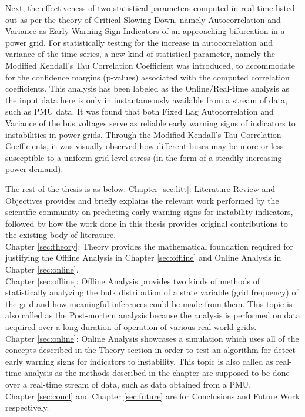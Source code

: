 Next, the effectiveness of two statistical parameters computed in real-time listed out as per the theory of Critical Slowing Down, namely Autocorrelation and Variance as Early Warning Sign Indicators of an approaching bifurcation in a power grid. For statistically testing for the increase in autocorrelation and variance of the time-series, a new kind of statistical parameter, namely the Modified Kendall's Tau Correlation Coefficient was introduced, to accommodate for the confidence margins (p-values) associated with the computed correlation coefficients. This analysis has been labeled as the Online/Real-time analysis as the input data here is only in instantaneously available from a stream of data, such as PMU data. It was found that both Fixed Lag Autocorrelation and Variance of the bus voltages serve as reliable early warning signs of indicators to instabilities in power grids. Through the Modified Kendall's Tau Correlation Coefficients, it was visually observed how different buses may be more or less susceptible to a uniform grid-level stress (in the form of a steadily increasing power demand).

The rest of the thesis is as below:
Chapter \ref{sec:litt}: Literature Review and Objectives provides and briefly explains the relevant work performed by the scientific community on predicting early warning signs for instability indicators, followed by how the work done in this thesis provides original contributions to the existing body of literature.  \\
Chapter \ref{sec:theory}: Theory provides the mathematical foundation required for justifying the Offline Analysis in Chapter \ref{sec:offline} and  Online Analysis in Chapter \ref{sec:online}.\\
Chapter \ref{sec:offline}: Offline Analysis provides two kinds of methods of statistically analyzing the bulk distribution of a state variable (grid frequency) of the grid and how meaningful inferences could be made from them. This topic is also called as the Post-mortem analysis because the analysis is performed on data acquired over a long duration of operation of various real-world grids.\\
Chapter \ref{sec:online}: Online Analysis showcases a simulation which uses all of the concepts described in the Theory section in order to test an algorithm for detect early warning signs for indicators to instability. This topic is also called as real-time analysis as the methods described in the chapter are supposed to be done over a real-time stream of data, such as data obtained from a PMU.\\
Chapter \ref{sec:concl} and Chapter \ref{sec:future} are for Conclusions and Future Work respectively.
